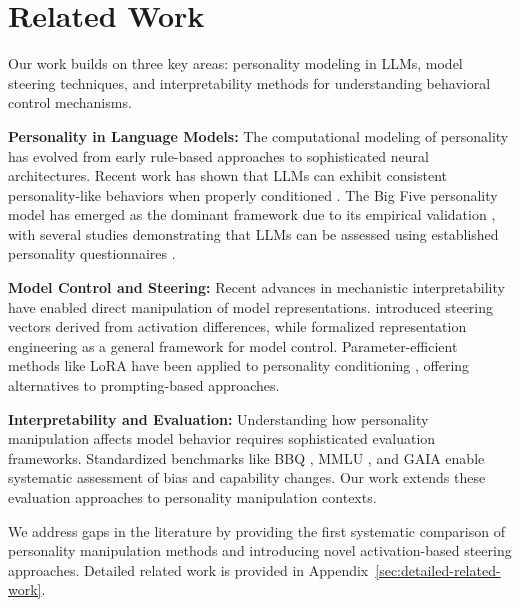 \section{Related Work}

Our work builds on three key areas: personality modeling in LLMs, model steering techniques, and interpretability methods for understanding behavioral control mechanisms.

\textbf{Personality in Language Models:} The computational modeling of personality has evolved from early rule-based approaches \citep{mairesse-walker-2007-personage} to sophisticated neural architectures. Recent work has shown that LLMs can exhibit consistent personality-like behaviors when properly conditioned \citep{jiang-etal-2023-personallm, huang-etal-2023-chatgpt-personality}. The Big Five personality model has emerged as the dominant framework due to its empirical validation \citep{costa-mccrae-1992-big5}, with several studies demonstrating that LLMs can be assessed using established personality questionnaires \citep{serapio-garcia-etal-2023-personality-traits-llms}.

\textbf{Model Control and Steering:} Recent advances in mechanistic interpretability have enabled direct manipulation of model representations. \citet{turner-etal-2023-activation-steering} introduced steering vectors derived from activation differences, while \citet{li-etal-2023-representation-engineering} formalized representation engineering as a general framework for model control. Parameter-efficient methods like LoRA \citep{hu-etal-2022-lora} have been applied to personality conditioning \citep{zhang-etal-2023-peft-personality}, offering alternatives to prompting-based approaches.

\textbf{Interpretability and Evaluation:} Understanding how personality manipulation affects model behavior requires sophisticated evaluation frameworks. Standardized benchmarks like BBQ \citep{parrish-etal-2022-bbq}, MMLU \citep{hendrycks-etal-2021-mmlu}, and GAIA \citep{mialon-etal-2023-gaia} enable systematic assessment of bias and capability changes. Our work extends these evaluation approaches to personality manipulation contexts.

We address gaps in the literature by providing the first systematic comparison of personality manipulation methods and introducing novel activation-based steering approaches. Detailed related work is provided in Appendix~\ref{sec:detailed-related-work}.